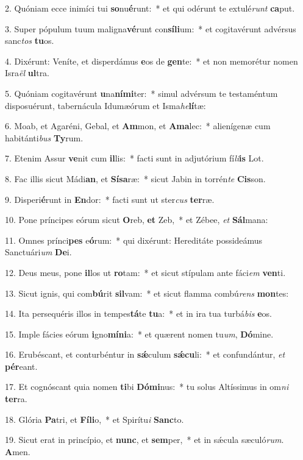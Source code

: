 2. Quóniam ecce inimíci tui \textbf{so}nu\textbf{é}runt:~*  et qui odérunt te extulé\textit{runt} \textbf{ca}put.\

3. Super pópulum tuum maligna\textbf{vé}runt con\textbf{sí}\textbf{li}um:~*  et cogitavérunt advérsus sanc\textit{tos} \textbf{tu}os.\

4. Dixérunt: Veníte, et disperdámus \textbf{e}os de \textbf{gen}te:~*  et non memorétur nomen Isra\textit{ël} \textbf{ul}tra.\

5. Quóniam cogitavérunt \textbf{u}na\textbf{ní}\textbf{mi}ter:~*  simul advérsum te testaméntum disposuérunt, tabernácula Idumæórum et Isma\textit{he}\textbf{lí}tæ:\

6. Moab, et Agaréni, Gebal, et \textbf{Am}mon, et \textbf{A}\textbf{ma}lec:~*  alienígenæ cum habitánti\textit{bus} \textbf{Ty}rum.\

7. Etenim Assur \textbf{ve}nit cum \textbf{il}lis:~*  facti sunt in adjutórium fí\textit{li}\textbf{is} Lot.\

8. Fac illis sicut Mádi\textbf{an}, et \textbf{Sí}\textbf{sa}ræ:~*  sicut Jabin in torrén\textit{te} \textbf{Cis}son.\

9. Disperi\textbf{é}runt in \textbf{En}dor:~*  facti sunt ut ster\textit{cus} \textbf{ter}ræ.\

10. Pone príncipes eórum sicut \textbf{O}reb, \textbf{et} Zeb,~*  et Zébee, \textit{et} \textbf{Sál}mana:\

11. Omnes prínci\textbf{pes} e\textbf{ó}rum:~*  qui dixérunt: Hereditáte possideámus Sanctuári\textit{um} \textbf{De}i.\

12. Deus meus, pone \textbf{il}los ut \textbf{ro}tam:~*  et sicut stípulam ante fáci\textit{em} \textbf{ven}ti.\

13. Sicut ignis, qui com\textbf{bú}rit \textbf{sil}vam:~*  et sicut flamma combú\textit{rens} \textbf{mon}tes:\

14. Ita persequéris illos in tempes\textbf{tá}te \textbf{tu}a:~*  et in ira tua turbá\textit{bis} \textbf{e}os.\

15. Imple fácies eórum \textbf{i}gno\textbf{mí}\textbf{ni}a:~*  et quærent nomen tu\textit{um}, \textbf{Dó}mine.\

16. Erubéscant, et conturbéntur in \textbf{sǽ}culum \textbf{sǽ}\textbf{cu}li:~*  et confundántur, \textit{et} \textbf{pér}eant.\

17. Et cognóscant quia nomen \textbf{ti}bi \textbf{Dó}\textbf{mi}nus:~*  tu solus Altíssimus in om\textit{ni} \textbf{ter}ra.\

18. Glória \textbf{Pa}tri, et \textbf{Fí}\textbf{li}o,~*  et Spirítu\textit{i} \textbf{Sanc}to.\

19. Sicut erat in princípio, et \textbf{nunc}, et \textbf{sem}per,~*  et in sǽcula sæculó\textit{rum}. \textbf{A}men.\

